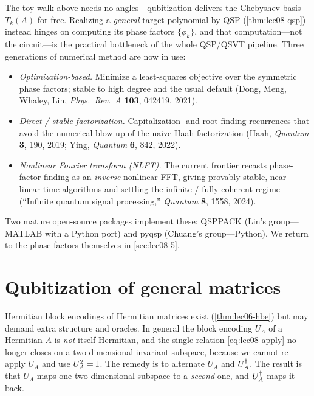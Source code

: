 \begin{remark}
\label{rem:lec08-phasefactors}
The toy walk above needs no angles---qubitization delivers the Chebyshev basis
$T_k(A)$ for free. Realizing a \emph{general} target polynomial by QSP
(\cref{thm:lec08-qsp}) instead hinges on computing its phase factors $\{\phi_k\}$, and
that computation---not the circuit---is the practical bottleneck of the whole QSP/QSVT
pipeline. Three generations of numerical method are now in use:
\begin{itemize}[leftmargin=1.4em,nosep]
  \item \emph{Optimization-based.} Minimize a least-squares objective over the symmetric
        phase factors; stable to high degree and the usual default
        (Dong, Meng, Whaley, Lin, \emph{Phys.\ Rev.\ A} \textbf{103}, 042419, 2021).
  \item \emph{Direct / stable factorization.} Capitalization- and root-finding
        recurrences that avoid the numerical blow-up of the naive Haah factorization
        (Haah, \emph{Quantum} \textbf{3}, 190, 2019; Ying, \emph{Quantum} \textbf{6},
        842, 2022).
  \item \emph{Nonlinear Fourier transform (NLFT).} The current frontier recasts
        phase-factor finding as an \emph{inverse} nonlinear FFT, giving provably stable,
        near-linear-time algorithms and settling the infinite / fully-coherent regime
        (``Infinite quantum signal processing,'' \emph{Quantum} \textbf{8}, 1558, 2024).
\end{itemize}
Two mature open-source packages implement these: \textsf{QSPPACK} (Lin's group---MATLAB
with a Python port) and \textsf{pyqsp} (Chuang's group---Python). We return to the phase
factors themselves in \cref{sec:lec08-5}.
\end{remark}

\section{Qubitization of general matrices}
\label{sec:lec08-3}

Hermitian block encodings of Hermitian matrices exist (\cref{thm:lec06-hbe}) but may
demand extra structure and oracles. In general the block encoding $U_A$ of a
Hermitian $A$ is \emph{not} itself Hermitian, and the single relation
\eqref{eq:lec08-apply} no longer closes on a two-dimensional invariant subspace,
because we cannot re-apply $U_A$ and use $U_A^2=\mathbb{I}$. The remedy is to alternate
$U_A$ and $U_A^{\dagger}$. The result is that $U_A$ maps one two-dimensional subspace to a
\emph{second} one, and $U_A^{\dagger}$ maps it back.

